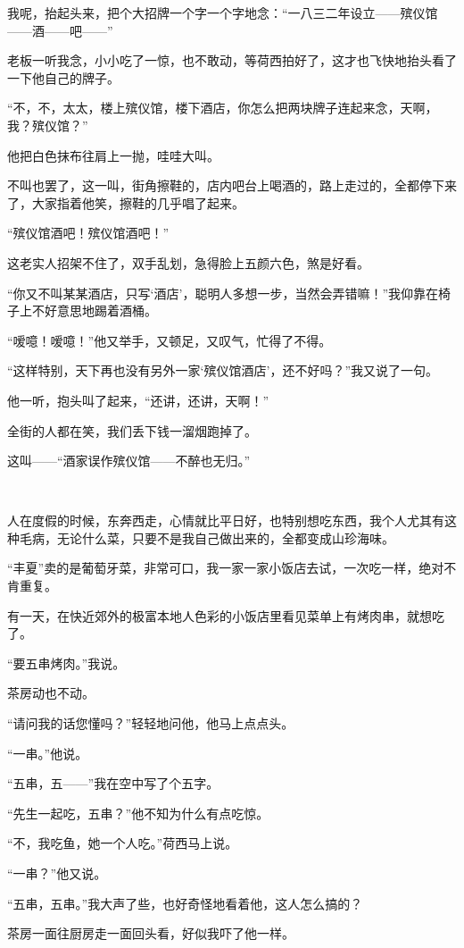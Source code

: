 \par 我呢，抬起头来，把个大招牌一个字一个字地念：“一八三二年设立——殡仪馆——酒——吧——”
\par 老板一听我念，小小吃了一惊，也不敢动，等荷西拍好了，这才也飞快地抬头看了一下他自己的牌子。
\par “不，不，太太，楼上殡仪馆，楼下酒店，你怎么把两块牌子连起来念，天啊，我？殡仪馆？”
\par 他把白色抹布往肩上一抛，哇哇大叫。
\par 不叫也罢了，这一叫，街角擦鞋的，店内吧台上喝酒的，路上走过的，全都停下来了，大家指着他笑，擦鞋的几乎唱了起来。
\par “殡仪馆酒吧！殡仪馆酒吧！”
\par 这老实人招架不住了，双手乱划，急得脸上五颜六色，煞是好看。
\par “你又不叫某某酒店，只写‘酒店’，聪明人多想一步，当然会弄错嘛！”我仰靠在椅子上不好意思地踢着酒桶。
\par “嗳噫！嗳噫！”他又举手，又顿足，又叹气，忙得了不得。
\par “这样特别，天下再也没有另外一家‘殡仪馆酒店’，还不好吗？”我又说了一句。
\par 他一听，抱头叫了起来，“还讲，还讲，天啊！”
\par 全街的人都在笑，我们丢下钱一溜烟跑掉了。
\par 这叫——“酒家误作殡仪馆——不醉也无归。”
\par  
\par 人在度假的时候，东奔西走，心情就比平日好，也特别想吃东西，我个人尤其有这种毛病，无论什么菜，只要不是我自己做出来的，全都变成山珍海味。
\par “丰夏”卖的是葡萄牙菜，非常可口，我一家一家小饭店去试，一次吃一样，绝对不肯重复。
\par 有一天，在快近郊外的极富本地人色彩的小饭店里看见菜单上有烤肉串，就想吃了。
\par “要五串烤肉。”我说。
\par 茶房动也不动。
\par “请问我的话您懂吗？”轻轻地问他，他马上点点头。
\par “一串。”他说。
\par “五串，五——”我在空中写了个五字。
\par “先生一起吃，五串？”他不知为什么有点吃惊。
\par “不，我吃鱼，她一个人吃。”荷西马上说。
\par “一串？”他又说。
\par “五串，五串。”我大声了些，也好奇怪地看着他，这人怎么搞的？
\par 茶房一面往厨房走一面回头看，好似我吓了他一样。
